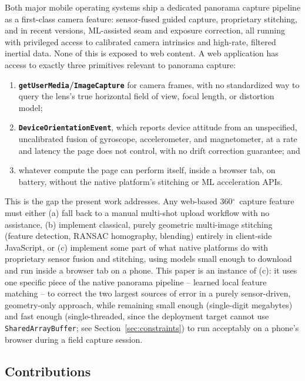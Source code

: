 \documentclass[11pt]{article}
\newcommand{\Deg}{\ensuremath{^{\circ}}}
\begin{document}
Both major mobile operating systems ship a dedicated panorama capture pipeline as a first-class camera feature: sensor-fused guided capture, proprietary stitching, and in recent versions, ML-assisted seam and exposure correction, all running with privileged access to calibrated camera intrinsics and high-rate, filtered inertial data. None of this is exposed to web content. A web application has access to exactly three primitives relevant to panorama capture:

\begin{enumerate}
\item \textbf{\texttt{getUserMedia}/\texttt{ImageCapture}} for camera frames, with no standardized way to query the lens's true horizontal field of view, focal length, or distortion model;
\item \textbf{\texttt{DeviceOrientationEvent}}, which reports device attitude from an unspecified, uncalibrated fusion of gyroscope, accelerometer, and magnetometer, at a rate and latency the page does not control, with no drift correction guarantee; and
\item whatever compute the page can perform itself, inside a browser tab, on battery, without the native platform's stitching or ML acceleration APIs.
\end{enumerate}

This is the gap the present work addresses. Any web-based 360\Deg\ capture feature must either (a) fall back to a manual multi-shot upload workflow with no assistance, (b) implement classical, purely geometric multi-image stitching (feature detection, RANSAC homography, blending) entirely in client-side JavaScript, or (c) implement some part of what native platforms do with proprietary sensor fusion and stitching, using models small enough to download and run inside a browser tab on a phone. This paper is an instance of (c): it uses one specific piece of the native panorama pipeline -- learned local feature matching -- to correct the two largest sources of error in a purely sensor-driven, geometry-only approach, while remaining small enough (single-digit megabytes) and fast enough (single-threaded, since the deployment target cannot use \texttt{SharedArrayBuffer}; see Section~\ref{sec:constraints}) to run acceptably on a phone's browser during a field capture session.

\subsection{Contributions}
\end{document}
